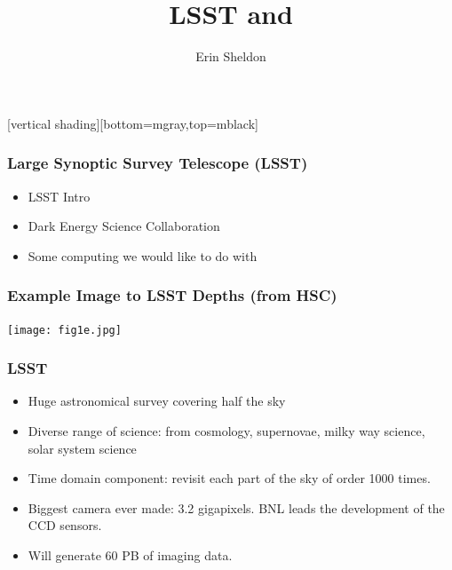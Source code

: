 \documentclass{beamer}
\title{LSST and \bigpanda}
\author{Erin Sheldon}
\institute{Brookhaven National Laboratory}
\begin{document}
\frame{\titlepage}


[vertical shading][bottom=mgray,top=mblack]

\frame
{
    \frametitle{Large Synoptic Survey Telescope (LSST)}

 
    \begin{itemize}

        \item LSST Intro
        \item Dark Energy Science Collaboration
        \item Some computing we would like to do with 

    \end{itemize}

}


{

    \frame
    {
        \frametitle{Example Image to LSST Depths (from HSC)}
        \begin{center}
            \texttt{[image: fig1e.jpg]}
            \newline
        \end{center}

    }

}



\frame
{
    \frametitle{LSST}

 
    \begin{itemize}

        \item Huge astronomical survey covering half the sky

        \item Diverse range of science: from cosmology,  supernovae, milky
            way science, solar system science

        \item Time domain component: revisit each part of the sky of order
            1000 times.

        \item Biggest camera ever made: 3.2 gigapixels.  BNL leads the
            development of the CCD sensors.

        \item Will generate 60 PB of imaging data.

    \end{itemize}

}
\end{document}
